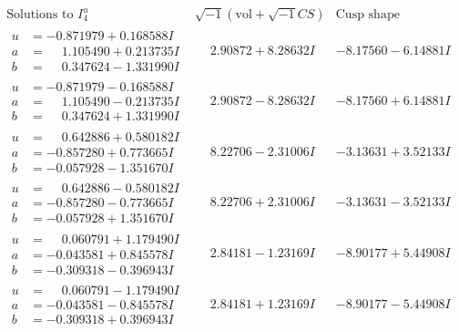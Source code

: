 \documentclass[1p]{elsarticle_modified}
\theoremstyle{definition}
\newcommand{\I}{\sqrt{-1}}
\begin{document}
$$\begin{array}{c|c|c}  
\text{Solutions to }I^u_{4}& \I (\text{vol} + \sqrt{-1}CS) & \text{Cusp shape}\\
 \hline 
\begin{aligned}
u &= -0.871979 + 0.168588 I \\
a &= \phantom{-}1.105490 + 0.213735 I \\
b &= \phantom{-}0.347624 - 1.331990 I\end{aligned}
 & \phantom{-}2.90872 + 8.28632 I & -8.17560 - 6.14881 I \\ \hline\begin{aligned}
u &= -0.871979 - 0.168588 I \\
a &= \phantom{-}1.105490 - 0.213735 I \\
b &= \phantom{-}0.347624 + 1.331990 I\end{aligned}
 & \phantom{-}2.90872 - 8.28632 I & -8.17560 + 6.14881 I \\ \hline\begin{aligned}
u &= \phantom{-}0.642886 + 0.580182 I \\
a &= -0.857280 + 0.773665 I \\
b &= -0.057928 - 1.351670 I\end{aligned}
 & \phantom{-}8.22706 - 2.31006 I & -3.13631 + 3.52133 I \\ \hline\begin{aligned}
u &= \phantom{-}0.642886 - 0.580182 I \\
a &= -0.857280 - 0.773665 I \\
b &= -0.057928 + 1.351670 I\end{aligned}
 & \phantom{-}8.22706 + 2.31006 I & -3.13631 - 3.52133 I \\ \hline\begin{aligned}
u &= \phantom{-}0.060791 + 1.179490 I \\
a &= -0.043581 + 0.845578 I \\
b &= -0.309318 - 0.396943 I\end{aligned}
 & \phantom{-}2.84181 - 1.23169 I & -8.90177 + 5.44908 I \\ \hline\begin{aligned}
u &= \phantom{-}0.060791 - 1.179490 I \\
a &= -0.043581 - 0.845578 I \\
b &= -0.309318 + 0.396943 I\end{aligned}
 & \phantom{-}2.84181 + 1.23169 I & -8.90177 - 5.44908 I \\ \hline\begin{aligned}

\end{aligned}
\end{array}$$
\end{document}
